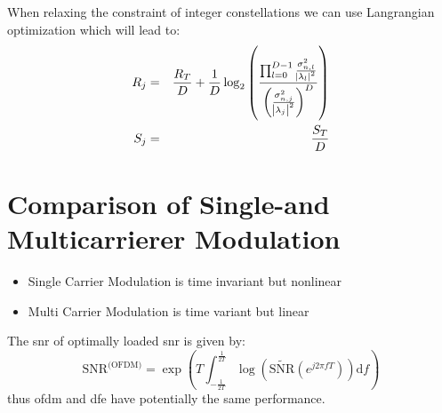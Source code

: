 When relaxing the constraint of integer constellations we can use Langrangian optimization
which will lead to:
\begin{eqnarray}
    R_j &=& \frac{R_T}{D} + \frac{1}{D} \log_2 \left(\frac{\prod_{l=0}^{D-1}
        \frac{\sigma_{n,l}^2}{\abs{\lambda_l}^2}}{
        {\left(\frac{\sigma_{n,j}^2}{\abs{\lambda_j}^2}\right)}^D}\right) \\
    S_j &=& \frac{S_T}{D}
\end{eqnarray}

\section{Comparison of Single-and Multicarrierer Modulation}
\begin{itemize}
    \item Single Carrier Modulation is time invariant but nonlinear
    \item Multi Carrier Modulation is time variant but linear
\end{itemize}

The \ac{snr} of optimally loaded \ac{snr} is given by:
\begin{equation}
    \text{SNR}^\text{(OFDM)} = \exp\left(T \int_{-\frac{1}{2T}}^\frac{1}{2T} 
        \log\left(\tilde{\text{SNR}}(e^{j 2 \pi f T})\right)\text{d}f\right)
\end{equation}
thus \ac{ofdm} and \ac{dfe} have potentially the same performance.
